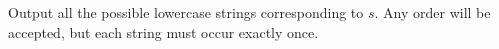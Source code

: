 
  Output all the possible lowercase strings corresponding to $s$. Any order
  will be accepted, but each string must occur exactly once.
